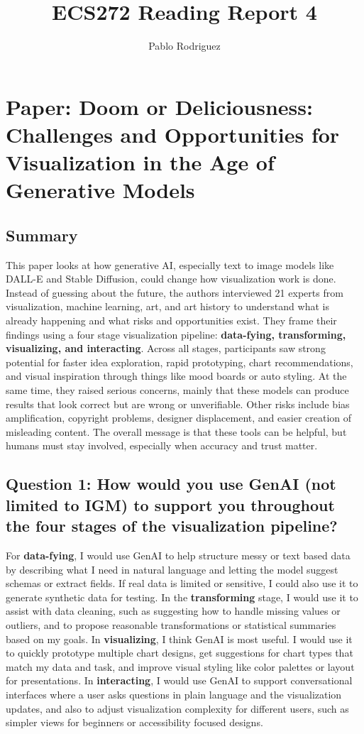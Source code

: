 \documentclass[11pt]{article}
\title{ECS272 Reading Report 4}
\author{Pablo Rodriguez}
\date{}
\begin{document}
\maketitle

\section*{Paper: Doom or Deliciousness: Challenges and Opportunities for Visualization in the Age of Generative Models}

\subsection*{Summary}

This paper looks at how generative AI, especially text to image models like DALL-E and Stable Diffusion, could change how visualization work is done. Instead of guessing about the future, the authors interviewed 21 experts from visualization, machine learning, art, and art history to understand what is already happening and what risks and opportunities exist. They frame their findings using a four stage visualization pipeline: \textbf{data-fying, transforming, visualizing, and interacting}. Across all stages, participants saw strong potential for faster idea exploration, rapid prototyping, chart recommendations, and visual inspiration through things like mood boards or auto styling. At the same time, they raised serious concerns, mainly that these models can produce results that look correct but are wrong or unverifiable. Other risks include bias amplification, copyright problems, designer displacement, and easier creation of misleading content. The overall message is that these tools can be helpful, but humans must stay involved, especially when accuracy and trust matter.

\subsection*{Question 1: How would you use GenAI (not limited to IGM) to support you throughout the four stages of the visualization pipeline?}

For \textbf{data-fying}, I would use GenAI to help structure messy or text based data by describing what I need in natural language and letting the model suggest schemas or extract fields. If real data is limited or sensitive, I could also use it to generate synthetic data for testing. In the \textbf{transforming} stage, I would use it to assist with data cleaning, such as suggesting how to handle missing values or outliers, and to propose reasonable transformations or statistical summaries based on my goals. In \textbf{visualizing}, I think GenAI is most useful. I would use it to quickly prototype multiple chart designs, get suggestions for chart types that match my data and task, and improve visual styling like color palettes or layout for presentations. In \textbf{interacting}, I would use GenAI to support conversational interfaces where a user asks questions in plain language and the visualization updates, and also to adjust visualization complexity for different users, such as simpler views for beginners or accessibility focused designs.
\end{document}
